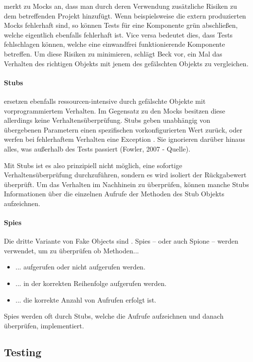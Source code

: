 \cite[145]{Beck:2003} merkt zu Mocks an, dass man durch deren Verwendung zusätzliche Risiken zu dem betreffenden Projekt hinzufügt. Wenn beispielsweise die extern produzierten Mocks fehlerhaft sind, so können Tests für eine Komponente grün abschließen, welche eigentlich ebenfalls fehlerhaft ist. Vice versa bedeutet dies, dass Tests fehlschlagen können, welche eine einwandfrei funktionierende Komponente betreffen.
Um diese Risiken zu minimieren, schlägt Beck vor, ein Mal das Verhalten des richtigen Objekts mit jenem des gefälschten Objekts zu vergleichen.

\paragraph{Stubs}
 ersetzen ebenfalls ressourcen-intensive durch gefälschte Objekte mit vorprogrammiertem Verhalten. Im Gegensatz zu den Mocks besitzen diese allerdings keine Verhaltensüberprüfung. Stubs geben unabhängig von übergebenen Parametern einen spezifischen vorkonfigurierten Wert zurück, oder werfen bei fehlerhaftem Verhalten eine Exception \autocite[443]{Johansen:2011}. Sie ignorieren darüber hinaus alles, was außerhalb des Tests passiert (Fowler, 2007 - Quelle).

Mit Stubs ist es also prinzipiell nicht möglich, eine sofortige Verhaltensüberprüfung durchzuführen, sondern es wird isoliert der Rückgabewert überprüft. Um das Verhalten im Nachhinein zu überprüfen, können manche Stubs Informationen über die einzelnen Aufrufe der Methoden des Stub Objekts aufzeichnen.

\paragraph{Spies}
Die dritte Variante von Fake Objects sind . Spies -- oder auch Spione -- werden verwendet, um zu überprüfen ob Methoden...
\begin{itemize}
  \item ... aufgerufen oder nicht aufgerufen werden.
  \item ... in der korrekten Reihenfolge aufgerufen werden.
  \item ... die korrekte Anzahl von Aufrufen erfolgt ist.
\end{itemize}

Spies werden oft durch Stubs, welche die Aufrufe aufzeichnen und danach überprüfen, implementiert.

\subsection{Testing}


